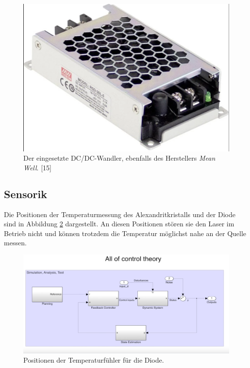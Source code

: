 \begin{figure}[H]
    \centering
    \includegraphics[scale=0.25, trim={1mm 1mm 1mm 1mm}, clip]{98_images/mean_well_dc_dc_converter.PNG}  
    \caption{Der eingesetzte DC/DC-Wandler, ebenfalls des Herstellers \textit{Mean Well}. [15]}
    \label{fig:dc_dc_wandler_hw}
\end{figure}

\subsection{Sensorik}
Die Positionen der Temperaturmessung des Alexandritkristalls und der Diode sind in Abbildung \ref{fig:temp_measurement_hw} dargestellt. An diesen Positionen stören sie den Laser im Betrieb nicht und können trotzdem die Temperatur möglichst nahe an der Quelle messen.\\

\begin{figure}[H]
    \centering
    \includegraphics[scale=0.2]{98_images/all_control_theory.PNG}
    \caption{Positionen der Temperaturfühler für die Diode.}
    \label{fig:temp_measurement_hw}
\end{figure}

